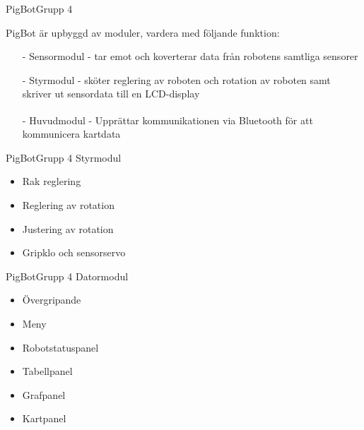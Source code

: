 \begin{frame}[fragile]{PigBot}{Grupp 4}

PigBot är upbyggd av moduler, vardera med följande funktion:
  \begin{itemize}
\pause
    \item[-] Sensormodul - tar emot och koverterar data från robotens samtliga sensorer
\pause
    \item[-] Styrmodul - sköter reglering av roboten och rotation av roboten samt skriver ut sensordata till en LCD-display
\pause
    \item[-] Huvudmodul - Upprättar kommunikationen via Bluetooth\textsuperscript{\circledR} för att kommunicera kartdata
  \end{itemize}
\end{frame}

\begin{frame}{PigBot}{Grupp 4}
	 Styrmodul
	 \begin{itemize}
		\item Rak reglering
		\item Reglering av rotation
		\item Justering av rotation
		\item Gripklo och sensorservo
	\end{itemize}
\end{frame}

\begin{frame}{PigBot}{Grupp 4}
	Datormodul
	\begin{itemize}
		\item Övergripande
		\item Meny
		\item Robotstatuspanel
		\item Tabellpanel
		\item Grafpanel
		\item Kartpanel
	\end{itemize}
\end{frame}





